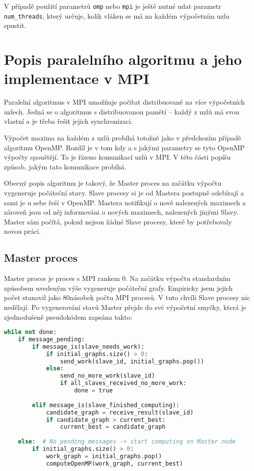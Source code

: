 \documentclass[czech]{article}
\begin{document}
V případě použití parametrů \texttt{omp} nebo \texttt{mpi} je ještě nutné udat parametr \texttt{num\_threads}, který určuje, kolik vláken se má na každém výpočetním uzlu spustit.

\section{Popis paralelního algoritmu a jeho implementace v MPI}
Paralelní algoritmus v MPI umožňuje počítat distribuovaně na více výpočetních uzlech. Jedná se o algoritmus s distribuovanou pamětí -- každý z uzlů má svou vlastní a je třeba řešit jejich synchronizaci.

Výpočet maxima na každém z uzlů probíhá totožně jako v předchozím případě algoritmu OpenMP. Rozdíl je v tom kdy a s jakými parametry se tyto OpenMP výpočty spouštějí. To je řízeno komunikací uzlů v MPI. V této části popíšu způsob, jakým tato komunikace probíhá.

Obecný popis algoritmu je takový, že Master proces na začátku výpočtu vygeneruje počáteční stavy. Slave procesy si je od Mastera postupně odebírají a sami je u sebe řeší v OpenMP. Mastera notifikují o nově nalezených maximech a zároveň jsou od něj informováni o nových maximech, nalezených jinými Slavy. Master sám počítá, pokud nejsou žádné Slave procesy, které by potřebovaly novou práci.

\subsection{Master proces}
Master proces je proces s MPI rankem 0. Na začátku výpočtu standardním způsobem uvedeným výše vygeneruje počáteční grafy. Empiricky jsem jejich počet stanovil jako 80násobek počtu MPI procesů. V tuto chvíli Slave procesy nic nedělají. Po vygenerování stavů Master přejde do své výpočetní smyčky, která je zjednodušeně pseudokódem zapsána takto:

\begin{lstlisting}[tabsize=2,language=python]
while not done:
	if message_pending:
		if message_is(slave_needs_work):
			if initial_graphs.size() > 0:
				send_work(slave_id, initial_graphs.pop())
			else:
				send_no_more_work(slave_id)
				if all_slaves_received_no_more_work:
					done = true
					
		elif message_is(slave_finished_computing):
			candidate_graph = receive_result(slave_id)
			if candidate_graph > current_best:
				current_best = candidate_graph
				
	else:  # No pending messages -> start computing on Master node
		if initial_graphs.size() > 0:
			work_graph = initial_graphs.pop()
			computeOpenMP(work_graph, current_best)
\end{lstlisting}
\end{document}
